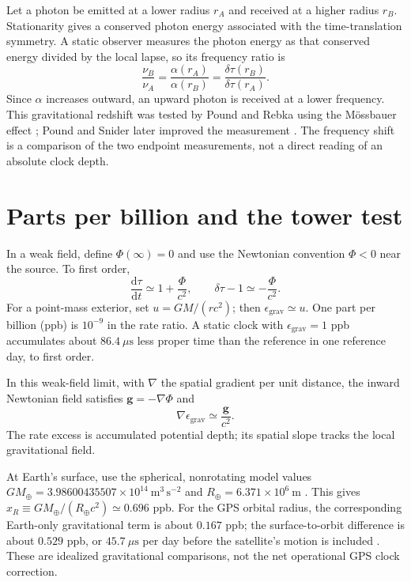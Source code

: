 \documentclass[12pt]{article}
\begin{document}
Let a photon be emitted at a lower radius $r_A$ and received at a higher radius $r_B$. Stationarity gives a conserved photon energy associated with the time-translation symmetry. A static observer measures the photon energy as that conserved energy divided by the local lapse, so its frequency ratio is
\begin{equation}
  \frac{\nu_B}{\nu_A}
  =\frac{\alpha(r_A)}{\alpha(r_B)}
  =\frac{\delta\tau(r_B)}{\delta\tau(r_A)}.
  \label{eq:photon-ratio}
\end{equation}
Since $\alpha$ increases outward, an upward photon is received at a lower frequency. This gravitational redshift was tested by Pound and Rebka using the Mössbauer effect \cite{PoundRebka}; Pound and Snider later improved the measurement \cite{PoundSnider}. The frequency shift is a comparison of the two endpoint measurements, not a direct reading of an absolute clock depth.

\section{Parts per billion and the tower test}

In a weak field, define $\Phi(\infty)=0$ and use the Newtonian convention $\Phi<0$ near the source. To first order,
\begin{equation}
  \frac{\mathrm{d}\tau}{\mathrm{d}t}
  \simeq1+\frac{\Phi}{c^2},
  \qquad
  \delta\tau-1
  \simeq-\frac{\Phi}{c^2}.
  \label{eq:weak-rate}
\end{equation}
For a point-mass exterior, set $u=GM/(rc^2)$; then $\epsilon_{\mathrm{grav}}\simeq u$. One part per billion (ppb) is $10^{-9}$ in the rate ratio. A static clock with $\epsilon_{\mathrm{grav}}=1$ ppb accumulates about $86.4\ \mu\mathrm{s}$ less proper time than the reference in one reference day, to first order.

In this weak-field limit, with $\nabla$ the spatial gradient per unit distance, the inward Newtonian field satisfies $\mathbf{g}=-\nabla\Phi$ and
\begin{equation}
  \nabla\epsilon_{\mathrm{grav}}
  \simeq\frac{\mathbf{g}}{c^2}.
  \label{eq:weak-depth-gradient}
\end{equation}
The rate excess is accumulated potential depth; its spatial slope tracks the local gravitational field.

At Earth's surface, use the spherical, nonrotating model values $GM_{\oplus}=3.98600435507\times10^{14}\ \mathrm{m^3\,s^{-2}}$ and $R_{\oplus}=6.371\times10^6\ \mathrm{m}$ \cite{JPL}. This gives $x_R\equiv GM_{\oplus}/(R_{\oplus}c^2)\simeq0.696$ ppb. For the GPS orbital radius, the corresponding Earth-only gravitational term is about $0.167$ ppb; the surface-to-orbit difference is about $0.529$ ppb, or $45.7\ \mu\mathrm{s}$ per day before the satellite's motion is included \cite{Ashby}. These are idealized gravitational comparisons, not the net operational GPS clock correction.
\end{document}

